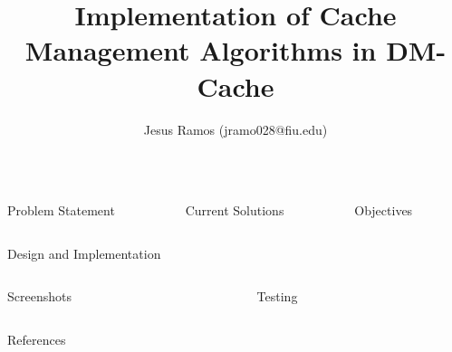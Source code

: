 \documentclass[final]{beamer}
\title{Implementation of Cache Management Algorithms in DM-Cache}
\author{Jesus Ramos (jramo028@fiu.edu)}
\institute[FIU]{Florida International University}
\date{}
\begin{document}
\begin{frame}{}

  \begin{columns}

    \begin{column}{.33\linewidth}
      \begin{block}{\large Problem Statement}
      \end{block}
    \end{column}

    \begin{column}{.33\linewidth}
      \begin{block}{\large Current Solutions}
      \end{block}
    \end{column}

    \begin{column}{.33\linewidth}
      \begin{block}{\large Objectives}
      \end{block}
    \end{column}

  \end{columns}

  \begin{block}{\large Design and Implementation}
  \end{block}

  \begin{columns}

    \begin{column}{.5\linewidth}
      \begin{block}{\large Screenshots}
      \end{block}
    \end{column}

    \begin{column}{.5\linewidth}
      \begin{block}{\large Testing}
      \end{block}
    \end{column}

  \end{columns}

  \begin{block}{\large References}
  \end{block}

\end{frame}
\end{document}
